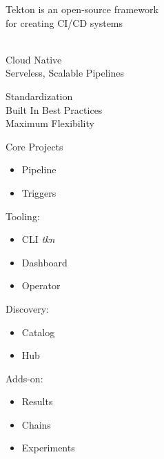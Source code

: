 \documentclass[aspectratio=169,11pt,hyperref={colorlinks=true}]{beamer}
\begin{document}
\begin{stripedframe}%
  {%
  Tekton is an open-source framework \\ for creating CI/CD systems \\ ~
  }%
  {%
  Cloud Native \\
  \vspace{0.03\textheight}
  Serveless, Scalable Pipelines \\
  \vspace{0.1\textheight}
  \centering
  
  }%
  {%
  Standardization \\
  \vspace{0.03\textheight}
  Built In Best Practices \\
  \vspace{0.03\textheight}
  Maximum Flexibility \\
  }%
  {%
  Core Projects
  \begin{itemize}
    \item Pipeline
    \item Triggers
  \end{itemize}
  \vspace{0.01\textheight}
  Tooling:
  \begin{itemize}
    \item CLI \textit{tkn}
    \item Dashboard
    \item Operator
  \end{itemize}
  }%
  {%
  Discovery:
  \begin{itemize}
    \item Catalog
    \item Hub
  \end{itemize}
  \vspace{0.01\textheight}
  Adds-on:
  \begin{itemize}
    \item Results
    \item Chains
    \item Experiments
  \end{itemize}
  }%
\end{stripedframe}

\end{document}
